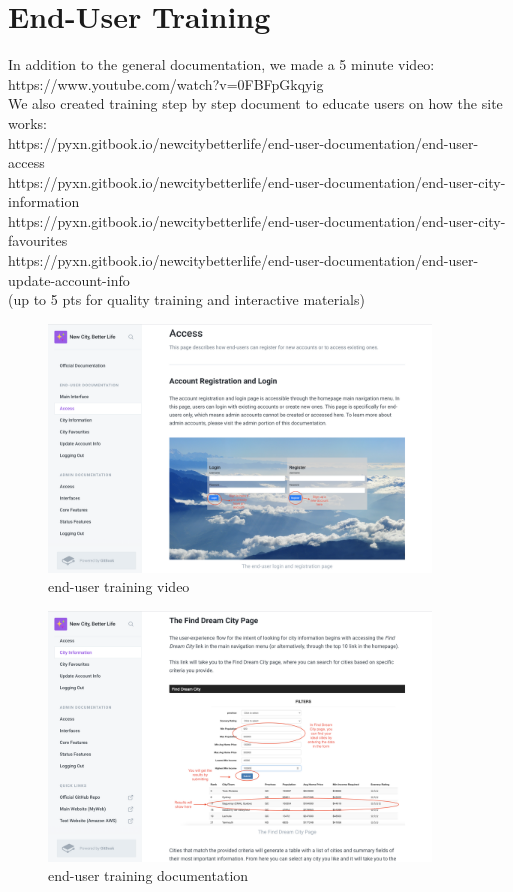 \documentclass[12pt, letterpaper]{article}
\begin{document}
 \newpage


\section{End-User Training}
In addition to the general documentation, we made a 5 minute video:
\\https://www.youtube.com/watch?v=0FBFpGkqyig
\\We also created training step by step document to educate users on how the site works: 
\\https://pyxn.gitbook.io/newcitybetterlife/end-user-documentation/end-user-access
\\https://pyxn.gitbook.io/newcitybetterlife/end-user-documentation/end-user-city-information
\\https://pyxn.gitbook.io/newcitybetterlife/end-user-documentation/end-user-city-favourites
\\https://pyxn.gitbook.io/newcitybetterlife/end-user-documentation/end-user-update-account-info
\\(up to 5 pts for quality training and interactive materials)

 \begin{figure}[htbp]
	\centering
	\includegraphics[width=4in]{images/q13.png}
	\caption{end-user training video}
 \end{figure}
 
 \begin{figure}[htbp]
	\centering
	\includegraphics[width=4in]{images/q13-2.png}
	\caption{end-user training documentation}
 \end{figure}
 
\end{document}
